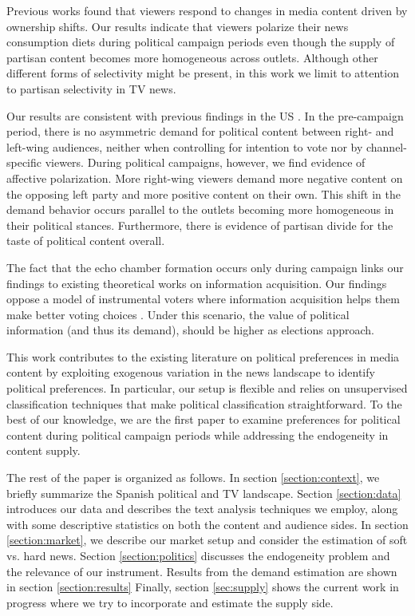 \documentclass[12pt]{article}
\begin{document}
Previous works \cite{durante2012partisan} found that viewers respond to changes in media content driven by ownership shifts. Our results indicate that viewers polarize their news consumption diets during political campaign periods even though the supply of partisan content becomes more homogeneous across outlets.  Although other different forms of selectivity might be present, in this work we limit to attention to partisan selectivity in TV news. 

Our results are consistent with previous findings in the US \citep{Peterson2017Echo}. In the pre-campaign period, there is no asymmetric demand for political content between right- and left-wing audiences, neither when controlling for intention to vote nor by channel-specific viewers. During political campaigns, however, we find evidence of affective polarization. More right-wing viewers demand more negative content on the opposing left party and more positive content on their own. This shift in the demand behavior occurs parallel to the outlets becoming more homogeneous in their political stances. Furthermore, there is evidence of partisan divide for the taste of political content overall.

The fact that the echo chamber formation occurs only during campaign links our findings to existing theoretical works on information acquisition. Our findings oppose a model of instrumental voters where information acquisition helps them make better voting choices \citep{larcinese2003}. Under this scenario, the value of political information (and thus its demand), should be higher as elections approach.  



This work contributes to the existing literature on political preferences in media content by exploiting exogenous variation in the news landscape to identify political preferences. In particular, our setup is flexible and relies on unsupervised classification techniques that make political classification straightforward. To the best of our knowledge, we are the first paper to examine preferences for political content during political campaign periods while addressing the endogeneity in content supply.

The rest of the paper is organized as follows. In section \ref{section:context}, we briefly summarize the Spanish political and TV landscape. Section \ref{section:data} introduces our data and describes the text analysis techniques we employ, along with some descriptive statistics on both the content and audience sides. In section \ref{section:market}, we describe our market setup and consider the estimation of soft vs. hard news. Section \ref{section:politics} discusses the endogeneity problem and the relevance of our instrument. Results from the demand estimation are shown in section \ref{section:results} Finally, section \ref{sec:supply} shows the current work in progress where we try to incorporate and estimate the supply side. 
\end{document}
